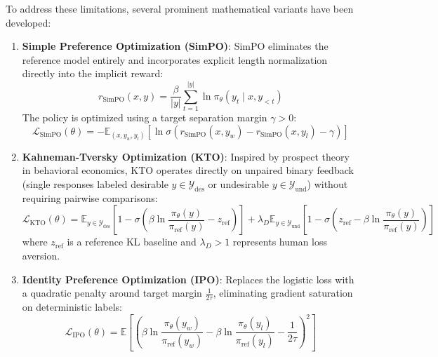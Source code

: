 \documentclass[11pt,a4paper]{article}
\theoremstyle{definition}
\begin{document}
To address these limitations, several prominent mathematical variants have been developed:
\begin{enumerate}
    \item \textbf{Simple Preference Optimization (SimPO)}: SimPO eliminates the reference model entirely and incorporates explicit length normalization directly into the implicit reward:
    {\boldmath
    \begin{equation}
    r_{\text{SimPO}}(x, y) = \frac{\beta}{|y|} \sum_{t=1}^{|y|} \ln \pi_\theta(y_t \mid x, y_{<t})
    \end{equation}
    }
    The policy is optimized using a target separation margin $\gamma > 0$:
    {\boldmath
    \begin{equation}
    \mathcal{L}_{\text{SimPO}}(\theta) = - \mathbb{E}_{(x, y_w, y_l)} \left[ \ln \sigma\left( r_{\text{SimPO}}(x, y_w) - r_{\text{SimPO}}(x, y_l) - \gamma \right) \right]
    \end{equation}
    }
    \item \textbf{Kahneman-Tversky Optimization (KTO)}: Inspired by prospect theory in behavioral economics, KTO operates directly on unpaired binary feedback (single responses labeled desirable $y \in \mathcal{Y}_{\text{des}}$ or undesirable $y \in \mathcal{Y}_{\text{und}}$) without requiring pairwise comparisons:
    {\boldmath
    \begin{equation}
    \mathcal{L}_{\text{KTO}}(\theta) = \mathbb{E}_{y \in \mathcal{Y}_{\text{des}}}\left[ 1 - \sigma\left( \beta \ln \frac{\pi_\theta(y)}{\pi_{\text{ref}}(y)} - z_{\text{ref}} \right) \right] + \lambda_D \mathbb{E}_{y \in \mathcal{Y}_{\text{und}}}\left[ 1 - \sigma\left( z_{\text{ref}} - \beta \ln \frac{\pi_\theta(y)}{\pi_{\text{ref}}(y)} \right) \right]
    \end{equation}
    }
    where $z_{\text{ref}}$ is a reference KL baseline and $\lambda_D > 1$ represents human loss aversion.
    \item \textbf{Identity Preference Optimization (IPO)}: Replaces the logistic loss with a quadratic penalty around target margin $\frac{1}{2\tau}$, eliminating gradient saturation on deterministic labels:
    {\boldmath
    \begin{equation}
    \mathcal{L}_{\text{IPO}}(\theta) = \mathbb{E}\left[ \left( \beta \ln \frac{\pi_\theta(y_w)}{\pi_{\text{ref}}(y_w)} - \beta \ln \frac{\pi_\theta(y_l)}{\pi_{\text{ref}}(y_l)} - \frac{1}{2\tau} \right)^2 \right]
    \end{equation}
    }
\end{enumerate}
\end{document}
